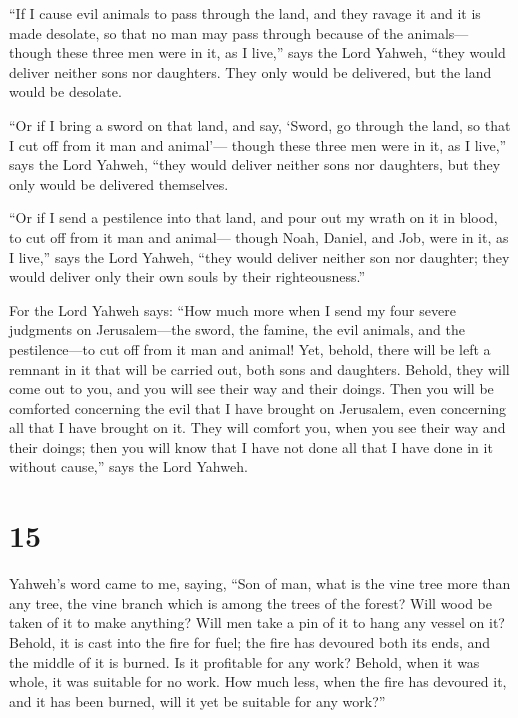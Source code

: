 ``If I cause evil animals to pass through the land, and
they ravage it and it is made desolate, so that no man may pass through
because of the animals---  though these three men were in
it, as I live,'' says the Lord Yahweh, ``they would deliver neither sons
nor daughters. They only would be delivered, but the land would be
desolate.

 ``Or if I bring a sword on that land, and say, `Sword,
go through the land, so that I cut off from it man and animal'---
 though these three men were in it, as I live,'' says the
Lord Yahweh, ``they would deliver neither sons nor daughters, but they
only would be delivered themselves.

 ``Or if I send a pestilence into that land, and pour out
my wrath on it in blood, to cut off from it man and animal---
 though Noah, Daniel, and Job, were in it, as I live,''
says the Lord Yahweh, ``they would deliver neither son nor daughter;
they would deliver only their own souls by their righteousness.''

 For the Lord Yahweh says: ``How much more when I send my
four severe judgments on Jerusalem---the sword, the famine, the evil
animals, and the pestilence---to cut off from it man and animal!
 Yet, behold, there will be left a remnant in it that
will be carried out, both sons and daughters. Behold, they will come out
to you, and you will see their way and their doings. Then you will be
comforted concerning the evil that I have brought on Jerusalem, even
concerning all that I have brought on it.  They will
comfort you, when you see their way and their doings; then you will know
that I have not done all that I have done in it without cause,'' says
the Lord Yahweh.

\hypertarget{section-13}{%
\section{15}\label{section-13}}

 Yahweh's word came to me, saying,  ``Son of
man, what is the vine tree more than any tree, the vine branch which is
among the trees of the forest?  Will wood be taken of it
to make anything? Will men take a pin of it to hang any vessel on it?
 Behold, it is cast into the fire for fuel; the fire has
devoured both its ends, and the middle of it is burned. Is it profitable
for any work?  Behold, when it was whole, it was suitable
for no work. How much less, when the fire has devoured it, and it has
been burned, will it yet be suitable for any work?''

